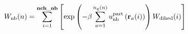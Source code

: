 \documentclass[12pt]{article}
\begin{document}
\begin{displaymath}
W_{\rm nb}(n) =
\sum_{i=1}^{\bf nch\_nb}
\left[
\exp\left(-\beta \sum_{a=1}^{n_{\rm g}(n)} u_{\rm nb}^{\rm part}\left({\bf r}_a(i)\right) \right)
W_{\rm dihed}(i)
\right]
\end{displaymath}
\end{document}
